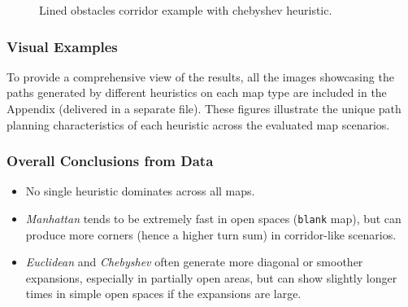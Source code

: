 \documentclass[letterpaper, 10 pt, conference]{ieeeconf}
\begin{document}
\begin{figure}[!ht]
    \centering
    \caption{Lined obstacles corridor example with chebyshev heuristic.}
    \label{fig:lined_corridor_paths}
\end{figure}

\subsubsection{Visual Examples}
To provide a comprehensive view of the results, all the images showcasing the paths generated by different heuristics on each map type are included in the 
Appendix (delivered in a separate file). These figures illustrate the unique path planning characteristics of each heuristic across the evaluated map 
scenarios.

\subsubsection{Overall Conclusions from Data}
\begin{itemize}
    \item No single heuristic dominates across all maps.
    \item \emph{Manhattan} tends to be extremely fast in open spaces (\texttt{blank} map), but can produce more corners (hence a higher turn sum) in corridor-like scenarios.
    \item \emph{Euclidean} and \emph{Chebyshev} often generate more diagonal or smoother expansions, especially in partially open areas, but can show slightly longer times in simple open spaces if the expansions are large.
\end{itemize}
\end{document}
